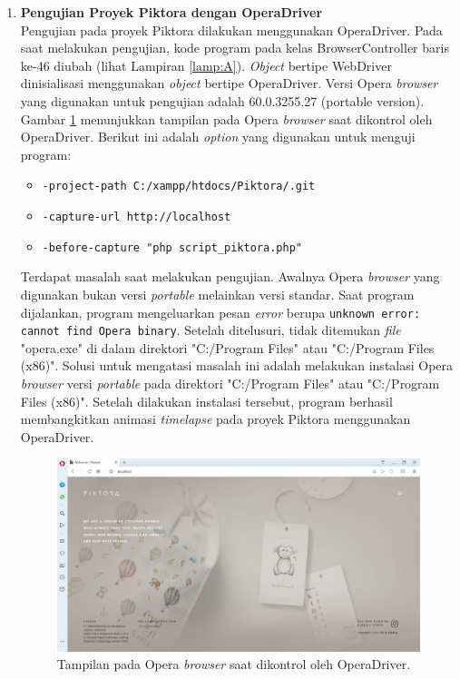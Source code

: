 \begin{enumerate}
\item \textbf{Pengujian Proyek Piktora dengan OperaDriver}\\
Pengujian pada proyek Piktora dilakukan menggunakan OperaDriver. Pada saat melakukan pengujian, kode program pada kelas BrowserController baris ke-46  diubah (lihat Lampiran \ref{lamp:A}). \textit{Object} bertipe WebDriver dinisialisasi menggunakan \textit{object} bertipe OperaDriver. Versi Opera \textit{browser} yang digunakan untuk pengujian adalah 60.0.3255.27 (portable version). Gambar \ref{fig:opera} menunjukkan tampilan pada Opera \textit{browser} saat dikontrol oleh OperaDriver. Berikut ini adalah \textit{option} yang digunakan untuk menguji program:
\begin{itemize}
\item \texttt{-project-path C:/xampp/htdocs/Piktora/.git}
\item \texttt{-capture-url http://localhost}
\item \texttt{-before-capture "php script\_piktora.php"}
\end{itemize}

Terdapat masalah saat melakukan pengujian. Awalnya Opera \textit{browser} yang digunakan bukan versi \textit{portable} melainkan versi standar. Saat program dijalankan, program mengeluarkan pesan \textit{error} berupa \texttt{unknown error: cannot find Opera binary}. Setelah ditelusuri, tidak ditemukan \textit{file} "opera.exe" di dalam direktori "C:/Program Files" atau "C:/Program Files (x86)". Solusi untuk mengatasi masalah ini adalah melakukan instalasi Opera \textit{browser} versi \textit{portable} pada direktori "C:/Program Files" atau "C:/Program Files (x86)". Setelah dilakukan instalasi tersebut, program berhasil membangkitkan animasi \textit{timelapse} pada proyek Piktora menggunakan OperaDriver. 

\begin{figure}[H]
	\centering
		\includegraphics[scale=0.4]{Gambar/Opera.png}
	\caption{Tampilan pada Opera \textit{browser} saat dikontrol oleh OperaDriver.}
	\label{fig:opera}
\end{figure}



\end{enumerate}
